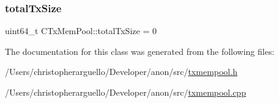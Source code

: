 \subsubsection{\texorpdfstring{total\+Tx\+Size}{totalTxSize}}
{\footnotesize\ttfamily uint64\+\_\+t C\+Tx\+Mem\+Pool\+::total\+Tx\+Size = 0\hspace{0.3cm}{\ttfamily [private]}}



The documentation for this class was generated from the following files\+:\begin{DoxyCompactItemize}
\item 
/\+Users/christopherarguello/\+Developer/anon/src/\mbox{\hyperlink{txmempool_8h}{txmempool.\+h}}\item 
/\+Users/christopherarguello/\+Developer/anon/src/\mbox{\hyperlink{txmempool_8cpp}{txmempool.\+cpp}}\end{DoxyCompactItemize}
